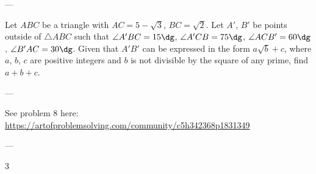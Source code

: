 
---

Let $ABC$ be a triangle with $AC=5-\sqrt3$, $BC=\sqrt2$. Let $A'$, $B'$ be points outside of $\triangle ABC$ such that $\angle A'BC=15\dg$, $\angle A'CB=75\dg$, $\angle ACB'=60\dg$, $\angle B'AC=30\dg$. Given that $A'B'$ can be expressed in the form $a\sqrt b+c$, where $a$, $b$, $c$ are positive integers and $b$ is not divisible by the square of any prime, find $a+b+c$.

---

See problem 8 here: \url{https://artofproblemsolving.com/community/c5h342368p1831349}

---

3
